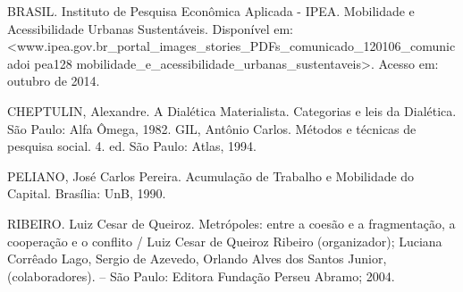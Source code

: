 \documentclass[article,12pt,onesidea,4paper,english,brazil]{abntex2}
\begin{document}
	\noindent BRASIL. Instituto de Pesquisa Econômica Aplicada - IPEA. Mobilidade e Acessibilidade Urbanas Sustentáveis. Disponível em:<www.ipea.gov.br\_portal\_images\_stories\_PDFs\_comunicado\_120106\_comunicadoi pea128 mobilidade\_e\_acessibilidade\_urbanas\_sustentaveis>. Acesso em: outubro de 2014.
	
	\noindent CHEPTULIN, Alexandre. A Dialética Materialista. Categorias e leis da Dialética. São Paulo: Alfa Ômega, 1982.
	GIL, Antônio Carlos. Métodos e técnicas de pesquisa social. 4. ed. São Paulo: Atlas, 1994.
	
	\noindent PELIANO, José Carlos Pereira. Acumulação de Trabalho e Mobilidade do Capital. Brasília: UnB, 1990.
	
	\noindent RIBEIRO. Luiz Cesar de Queiroz. Metrópoles: entre a coesão e a fragmentação, a cooperação e o conflito / Luiz Cesar de Queiroz Ribeiro (organizador); Luciana Corrêado Lago, Sergio de Azevedo, Orlando Alves dos Santos Junior, (colaboradores). – São Paulo: Editora Fundação Perseu Abramo; 2004.
	
\end{document}
